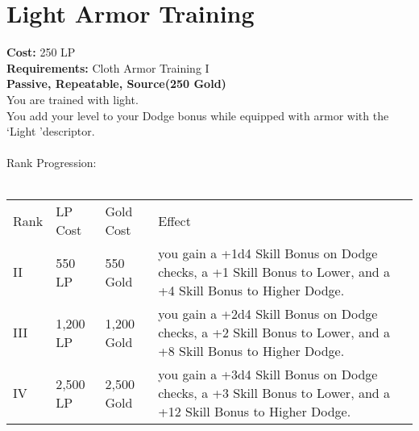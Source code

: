 \section{Light Armor Training}\label{perk:lightArmorTraining}
\textbf{Cost:} 250 LP\\
\textbf{Requirements:} Cloth Armor Training I\\
\textbf{Passive, Repeatable, Source(250 Gold)}\\
You are trained with light.\\
You add your level to your Dodge bonus while equipped with armor with the \lq Light \rq descriptor.\\
\\

Rank Progression:\\
\\
\begin{longtable}{l | l | l | p{9cm}}
	Rank & LP Cost & Gold Cost & Effect\\
	II & 550 LP & 550 Gold & you gain a +1d4 Skill Bonus on Dodge checks, a +1 Skill Bonus to Lower, and a +4 Skill Bonus to Higher Dodge.\\
	III & 1,200 LP & 1,200 Gold & you gain a +2d4 Skill Bonus on Dodge checks, a +2 Skill Bonus to Lower, and a +8 Skill Bonus to Higher Dodge.\\
	IV & 2,500 LP & 2,500 Gold & you gain a +3d4 Skill Bonus on Dodge checks, a +3 Skill Bonus to Lower, and a +12 Skill Bonus to Higher Dodge.\\
\end{longtable}
